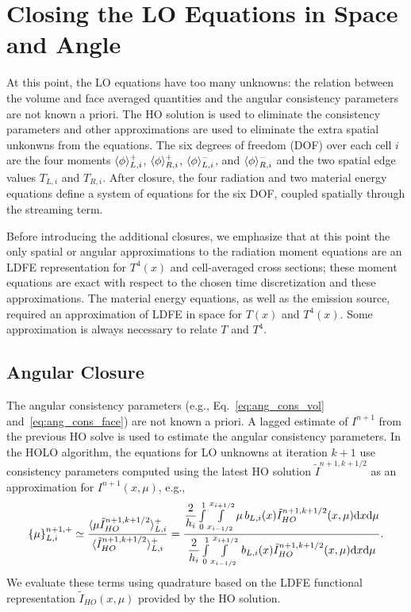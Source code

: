 \section{Closing the LO Equations in Space and Angle}
\label{sec:closure}

At this point, the LO equations have too many unknowns: the relation between the volume
and face averaged quantities and the angular consistency parameters are not known a
priori. The HO solution is used to eliminate the consistency parameters and other
approximations are used to eliminate the extra spatial unkonwns from the equations.
The six degrees of freedom (DOF) over each cell $i$ are the four moments $\langle \phi \rangle_{L,i}^+$,
$\langle \phi \rangle_{R,i}^+$, $\langle \phi \rangle_{L,i}^-$, and $\langle \phi \rangle_{R,i}^-$ and the two
spatial edge values $T_{L,i}$ and $T_{R,i}$.  After closure, the four radiation and two material
energy equations define a system of equations for the six DOF, coupled spatially through
the streaming term.  

Before introducing the additional closures, we emphasize that at this point the only spatial or
angular approximations to the radiation  moment equations are an LDFE
representation for $T^4(x)$ and cell-averaged cross sections; these moment equations are exact with
respect to the chosen time discretization and these approximations.  The material energy
equations, as well as the emission source, required an approximation of LDFE in space for $T(x)$ and $T^4(x)$.  Some
approximation is always necessary
to relate $T$ and $T^4$.

\subsection{Angular Closure}

The angular consistency
parameters (e.g., Eq.~\eqref{eq:ang_cons_vol} and~\eqref{eq:ang_cons_face}) are not known a priori. 
A lagged estimate of $I^{n+1}$ from the previous HO solve is
used to estimate the angular consistency parameters. In the HOLO algorithm, the equations for LO unknowns at iteration $k+1$ use consistency parameters
computed using the latest HO solution $\tilde{I}^{n+1,k+1/2}$
as an approximation for $I^{n+1}(x,\mu)$, e.g.,
\begin{equation}\label{eq:ang_cons_vol}
    \left\{ {\mu} \right\}_{L,i}^{n+1,+} \simeq \frac{\langle \mu
    \tilde I_{HO}^{n+1,k+1/2} \rangle_{L,i}^+}{\langle \tilde I_{HO}^{n+1,k+1/2} \rangle_{L,i}^+} =  \frac{
{\displaystyle \frac{2}{h_i}} \int\limits_0^1 \int\limits_{x_{i-1/2}}^{x_{i+1/2}} \mu \, b_{L,i}(x)
\tilde I^{n+1,k+1/2}_{HO}(x,\mu) \mathrm{d} x \mathrm{d} \mu } 
{{\displaystyle \frac{2}{h_i}} \int\limits_0^1 \int\limits_{x_{i-1/2}}^{x_{i+1/2}} \, b_{L,i}(x)
\tilde I^{n+1,k+1/2}_{HO}(x,\mu) \mathrm{d} x \mathrm{d} \mu } .
\end{equation}
We evaluate these terms using quadrature based
on the LDFE functional representation $\tilde I_{HO}(x,\mu)$ provided by the HO solution.


